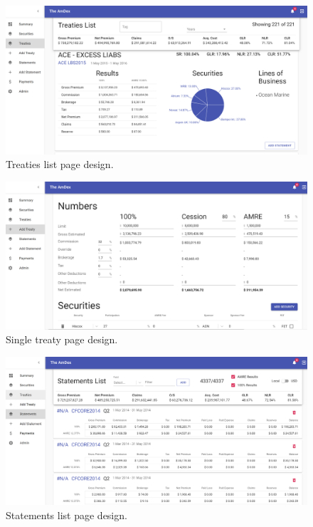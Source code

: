 \documentclass[12pt]{article}
\begin{document}
\begin{figure}[H]
    \includegraphics[width=\linewidth]{treaties.png}
    \caption{Treaties list page design.}
    \label{fig:treaties}
\end{figure}

\begin{figure}[H]
    \includegraphics[width=\linewidth]{treaty.png}
    \caption{Single treaty page design.}
    \label{fig:treaty}
\end{figure}

\begin{figure}[H]
    \includegraphics[width=\linewidth]{statements.png}
    \caption{Statements list page design.}
    \label{fig:statements}
\end{figure}
\end{document}
